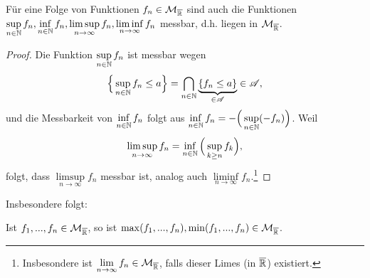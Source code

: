 \begin{lemma}
\begin{mdframed}
Für eine Folge von Funktionen $f_n \in \mathcal{M}_{\overline{\mathbb{R}}}$ sind auch die Funktionen
$
\sup\limits_{n\in\mathbb{N}}f_n, \inf\limits_{n\in\mathbb{N}}f_n, \limsup\limits_{n\to\infty}f_n, \liminf\limits_{n\to\infty}f_n
$
messbar, d.h. liegen in $\mathcal{M}_{\overline{\mathbb{R}}}$.
\end{mdframed}
\begin{proof} Die Funktion $\sup\limits_{n\in\mathbb{N}} f_n$ ist messbar wegen
$$\Big\{ \sup\limits_{n\in\mathbb{N}}  f_n \leq a \Big\} = \bigcap\limits_{n\in\mathbb{N}} \underbrace{\{f_n \leq a\}}_{\in \mathscr{A}} \in \mathscr{A},$$
und die Messbarkeit von $\inf\limits_{n\in\mathbb{N}} f_n$ folgt aus $\inf\limits_{n\in\mathbb{N}} f_n = - \Big( \sup\limits_{n\in\mathbb{N}} (-f_n) \Big)$. Weil
$$
\limsup_{n\to\infty} f_n=\inf_{n \in \mathbb{N}} \Big(\sup_{k \geq n} f_k\Big),
$$
folgt, dass $\limsup\limits_{n\to\infty} f_n$ messbar ist, analog auch $\liminf\limits_{n\to\infty} f_n$.\footnote{Insbesondere ist $\lim\limits_{n\to\infty}f_n\in \mathcal{M}_{\overline{\mathbb{R}}}$, falls dieser Limes (in $\overline{\mathbb{R}}$) existiert.}
\end{proof}
\end{lemma}
Insbesondere folgt:

\begin{korollar}
Ist $f_1,...,f_n \in \mathcal{M}_{\overline{\mathbb{R}}}$, so ist $\max(f_1,...,f_n),\min(f_1,...,f_n)\in \mathcal{M}_{\overline{\mathbb{R}}}$.
\end{korollar}

